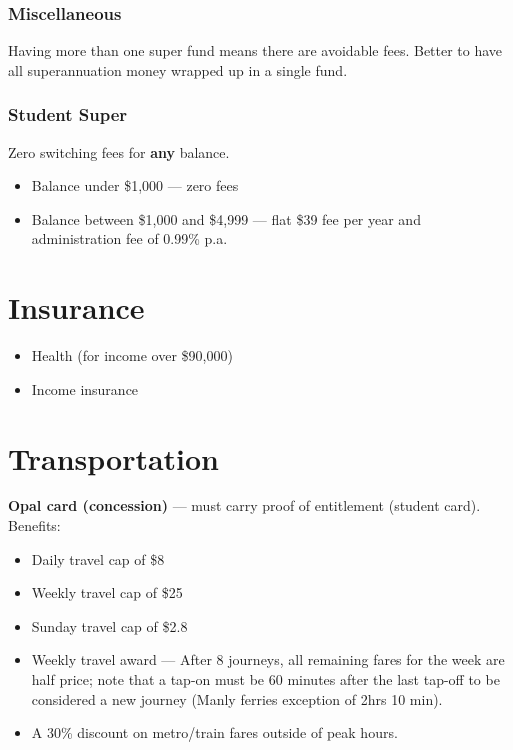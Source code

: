 \subsubsection{Miscellaneous}
Having more than one super fund means there are avoidable fees. Better to have all superannuation money wrapped up in a single fund.

\subsubsection{Student Super}
Zero switching fees for \textbf{any} balance.
\begin{itemize}
	\item Balance under \$1,000 --- zero fees
	\item Balance between \$1,000 and \$4,999 --- flat \$39 fee per year and administration fee of 0.99\% p.a.
\end{itemize}

\section{Insurance}
\begin{itemize}
	\item Health (for income over \$90,000)
	\item Income insurance
\end{itemize}

\section{Transportation}

\textbf{Opal card (concession)} --- must carry proof of entitlement (student card). Benefits:

\begin{itemize}
	\item Daily travel cap of \$8
	\item Weekly travel cap of \$25
	\item Sunday travel cap of \$2.8
	\item Weekly travel award --- After 8 journeys, all remaining fares for the week are half price; note that a tap-on must be 60 minutes after the last tap-off to be considered a new journey (Manly ferries exception of 2hrs 10 min).
	\item A 30\% discount on metro/train fares outside of peak hours.
\end{itemize}